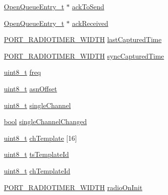\begin{DoxyCompactItemize}
\item 
\hyperlink{struct_open_queue_entry__t}{Open\+Queue\+Entry\+\_\+t} $\ast$ \hyperlink{structieee154e__vars__t_a83d623a033cf54ec3e11cf5dee901d90}{ack\+To\+Send}
\item 
\hyperlink{struct_open_queue_entry__t}{Open\+Queue\+Entry\+\_\+t} $\ast$ \hyperlink{structieee154e__vars__t_a63483fa014605bf098b11813b57ff156}{ack\+Received}
\item 
\hyperlink{z1_2board__info_8h_ac16e02aadd749b2d27638bed1a805a59}{P\+O\+R\+T\+\_\+\+R\+A\+D\+I\+O\+T\+I\+M\+E\+R\+\_\+\+W\+I\+D\+TH} \hyperlink{structieee154e__vars__t_a51c3f927191002cab101439234cc8550}{last\+Captured\+Time}
\item 
\hyperlink{z1_2board__info_8h_ac16e02aadd749b2d27638bed1a805a59}{P\+O\+R\+T\+\_\+\+R\+A\+D\+I\+O\+T\+I\+M\+E\+R\+\_\+\+W\+I\+D\+TH} \hyperlink{structieee154e__vars__t_a7e5f12b8f27863259e2e3d6bf8c56dcf}{sync\+Captured\+Time}
\item 
\hyperlink{_p_e___types_8h_aba7bc1797add20fe3efdf37ced1182c5}{uint8\+\_\+t} \hyperlink{structieee154e__vars__t_a98c1bb462ffdc5720382fc437a7893a3}{freq}
\item 
\hyperlink{_p_e___types_8h_aba7bc1797add20fe3efdf37ced1182c5}{uint8\+\_\+t} \hyperlink{structieee154e__vars__t_acd689febb1e54412f6faff6a6db0b5c9}{asn\+Offset}
\item 
\hyperlink{_p_e___types_8h_aba7bc1797add20fe3efdf37ced1182c5}{uint8\+\_\+t} \hyperlink{structieee154e__vars__t_a34565f0e2e73140299fb3fed4a3a4c9b}{single\+Channel}
\item 
\hyperlink{_p_e___types_8h_a97a80ca1602ebf2303258971a2c938e2}{bool} \hyperlink{structieee154e__vars__t_ab015fa5dafba6da674e38dcb30a8b603}{single\+Channel\+Changed}
\item 
\hyperlink{_p_e___types_8h_aba7bc1797add20fe3efdf37ced1182c5}{uint8\+\_\+t} \hyperlink{structieee154e__vars__t_a8ea426fa464ed96aeb12f16c2985171d}{ch\+Template} \mbox{[}16\mbox{]}
\item 
\hyperlink{_p_e___types_8h_aba7bc1797add20fe3efdf37ced1182c5}{uint8\+\_\+t} \hyperlink{structieee154e__vars__t_a73905d34d7732a5f7e30a648f48f605d}{ts\+Template\+Id}
\item 
\hyperlink{_p_e___types_8h_aba7bc1797add20fe3efdf37ced1182c5}{uint8\+\_\+t} \hyperlink{structieee154e__vars__t_a16cb3cb1d1a46f7d49b36caa23fba668}{ch\+Template\+Id}
\item 
\hyperlink{z1_2board__info_8h_ac16e02aadd749b2d27638bed1a805a59}{P\+O\+R\+T\+\_\+\+R\+A\+D\+I\+O\+T\+I\+M\+E\+R\+\_\+\+W\+I\+D\+TH} \hyperlink{structieee154e__vars__t_a74c2cf9c2431f10924a7d1f0d81f6305}{radio\+On\+Init}

\end{DoxyCompactItemize}
